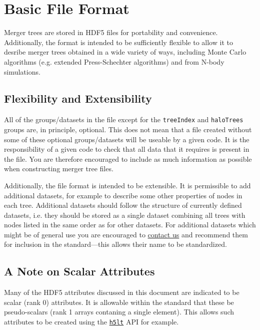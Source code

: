 \section{Basic File Format}\label{sec:MergerTreeFormatDescription}

Merger trees are stored in HDF5 files for portability and convenience. Additionally, the format is intended to be sufficiently flexible to allow it to desribe merger trees obtained in a wide variety of ways, including Monte Carlo algorithms (e.g. extended Press-Schechter algorithms) and from N-body simulations. 

\subsection{Flexibility and Extensibility}

All of the groups/datasets in the file except for the {\tt treeIndex} and {\tt haloTrees} groups are, in principle, optional. This does not mean that a file created without some of these optional groups/datasets will be useable by a given code. It is the responsibility of a given code to check that all data that it requires is present in the file. You are therefore encouraged to include as much information as possible when constructing merger tree files.

Additionally, the file format is intended to be extensible. It is permissible to add additional datasets, for example to describe some other properties of nodes in each tree. Additional datasets should follow the structure of currently defined datasets, i.e. they should be stored as a single dataset combining all trees with nodes listed in the same order as for other datasets. For additional datasets which might be of general use you are encouraged to \href{mailto:abenson@obs.carnegiescience.edu}{contact us} and recommend them for inclusion in the standard---this allows their name to be standardized.

\subsection{A Note on Scalar Attributes}

Many of the HDF5 attributes discussed in this document are indicated to be scalar (rank 0) attributes. It is allowable within the standard that these be pseudo-scalars (rank 1 arrays contaning a single element). This allows such attributes to be created using the \href{http://www.hdfgroup.org/HDF5/doc/HL/RM_H5LT.html}{\tt h5lt} API for example.

